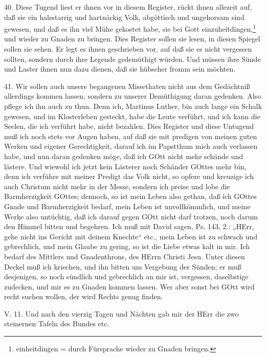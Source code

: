40. Diese Tugend liest er ihnen vor in diesem Register, rückt ihnen allezeit auf, daß sie ein halsstarrig und hartnäckig Volk, abgöttisch und ungehorsam sind gewesen, und daß es ihn viel Mühe gekostet habe, sie bei Gott einzuheitdingen,\footnote{einheitdingen = durch Fürsprache wieder zu Gnaden bringen.} und wieder zu Gnaden zu bringen. Dies Register sollen sie lesen, in diesen Spiegel sollen sie sehen. Er legt es ihnen geschrieben vor, auf daß sie es nicht vergessen sollten, sondern durch ihre Legende gedemüthigt würden. Und müssen ihre Sünde und Laster ihnen nun dazu dienen, daß sie hübscher fromm sein möchten.

41. Wir sollen auch unsere begangenen Missethaten nicht aus dem Gedächtniß allerdings kommen
lassen, sondern zu unserer Demüthigung daran gedenken. Also pflege ich ihn auch zu thun. Denn ich, Martinus Luther, bin auch lange ein Schalk gewesen, und im Klosterleben gesteckt, habe die Leute verführt, und ich kann die Seelen, die ich verführt habe, nicht bezahlen. Dies Register und diese Untugend muß ich noch stets vor Augen haben, auf daß sie mit predigen von meinen guten Werken und eigener Gerechtigkeit, darauf ich im Papstthum mich auch verlassen habe, und nun daran gedenken möge, daß ich GOtt nicht mehr schände und lästere. Und wiewohl ich jetzt kein Lästerer noch Schänder GOttes mehr bin, denn ich verführe mit meiner Predigt das Volk nicht, so opfere und kreuzige ich auch Christum nicht mehr in der Messe, sondern ich preise und lobe die Barmherzigkeit GOttes; dennoch, so ist mein Leben also gethan, daß ich GOttes Gnade und Barmherzigkeit bedarf, mein Leben ist unvollkömmlich, und meine Werke also untüchtig, daß ich darauf gegen GOtt nicht darf trotzen, noch darum den Himmel bitten und begehren. Ich muß mit David sagen, Ps. 143, 2.: „HErr, gehe nicht ins Gericht mit deinem Knechte“ etc., mein Leben ist zu schwach und gebrechlich, und mein Glaube zu gering, so ist die Liebe etwas kalt in mir. Ich bedarf des Mittlers und Gnadenthrons, des HErrn Christi Jesu. Unter diesen Deckel muß ich kriechen, und ihn bitten um Vergebung der Sünden; er muß desjenigen, so noch sündlich und gebrechlich an mir ist, vergessen, daselbstige zudecken, und mir es zu Gnaden kommen lassen. Wer aber sonst bei GOtt wird recht suchen wollen, der wird Rechts genug finden.

\begin{schriftzitat}
V. 11. Und nach den vierzig Tagen und Nächten gab mir der HErr die zwo steinernen Tafeln des Bundes etc.
\end{schriftzitat}

